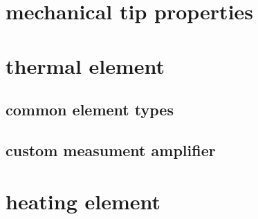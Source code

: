 \section{mechanical tip properties}

\section{thermal element}

\subsection{common element types}
\subsection{custom measument amplifier}

\section{heating element}
